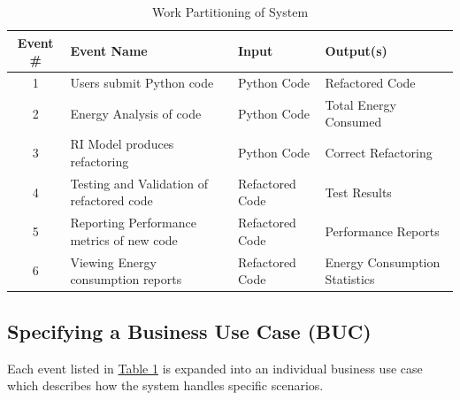 \documentclass[12pt]{article}
\begin{document}
\begin{table}[H]
  \centering
  \setlength\extrarowheight{5mm} 
  \begin{tabularx}{\textwidth}{|c|X|l|p{1.5in}|} 
    \toprule \textbf{Event \#} & \textbf{Event Name} & \textbf{Input} & \textbf{Output(s)} \\ 
    \midrule 
    1 & Users submit Python code & Python Code & Refactored Code\\
    2 & Energy Analysis of code & Python Code & Total Energy Consumed \\
    3 & RI Model produces refactoring & Python Code & Correct Refactoring \\
    4 & Testing and Validation of refactored code & Refactored Code & Test Results \\
    5 & Reporting Performance metrics of new code & Refactored Code & Performance Reports \\
    6 & Viewing Energy consumption reports & Refactored Code & Energy Consumption Statistics \\
    \bottomrule 
  \end{tabularx}
  \caption{Work Partitioning of System}
  \label{tab:work-part}
\end{table}

\subsection{Specifying a Business Use Case (BUC)}
Each event listed in \hyperref[tab:work-part]{Table 1} is expanded into an individual business use case which describes how the system handles specific scenarios.
\end{document}
